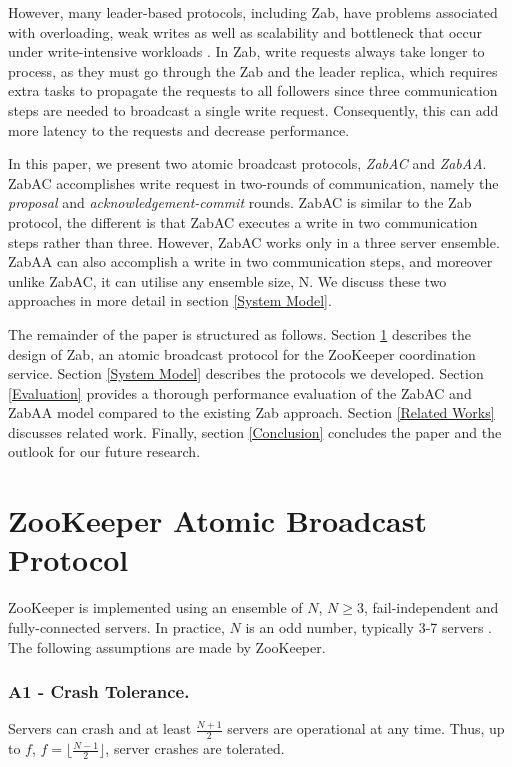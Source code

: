 \documentclass[a4paper,UKenglish]{oasics-v2016}
\begin{document}
However, many leader-based protocols, including Zab, have problems
associated with overloading, weak writes as well as scalability and bottleneck that occur under write-intensive workloads \cite{r5,r9,r39}.
In Zab, write requests always take longer to process, as they must
go through the Zab and the leader replica, which requires extra tasks
to propagate the requests to all followers since three communication
steps are needed to broadcast a single write request. Consequently, this can
add more latency to the requests and decrease performance.

In this paper, we present two atomic broadcast
protocols, \emph{ZabAC} and  \emph{ZabAA}. ZabAC accomplishes write request
in two-rounds of communication, namely the \emph{proposal} and \emph{acknowledgement-commit} rounds. ZabAC is similar to the Zab protocol, the different is that ZabAC executes a write in two communication steps rather than three. However, ZabAC works only in a three server ensemble. ZabAA can also accomplish a write in two communication steps, and moreover unlike ZabAC, it can utilise any ensemble size, N. We discuss these two approaches in more detail in section \ref{System Model}.

The remainder of the paper is structured as follows. Section \ref{Zookeeper-broadcast-protocol}  describes the design of Zab, an atomic broadcast protocol for the ZooKeeper coordination service. Section \ref{System Model} describes the protocols we developed. Section \ref{Evaluation} provides a thorough performance evaluation of the ZabAC and ZabAA model compared to the existing Zab approach. Section \ref{Related Works} discusses related work. Finally, section \ref{Conclusion} concludes the paper and the outlook for our future research.



\section{ZooKeeper Atomic Broadcast Protocol} \label{Zookeeper-broadcast-protocol}

ZooKeeper is implemented using an ensemble of $N$, $N \geq 3 $, fail-independent and fully-connected servers.
In practice, $N$ is an odd number, typically 3-7 servers \cite{r6}. The following assumptions are made by ZooKeeper.

\subsubsection*{A1 - Crash Tolerance.}
Servers can crash and at least $\frac{N+1}{2}$ servers are operational at any time.
Thus, up to  $f$, $f = \lfloor\frac{N-1}{2}\rfloor$, server crashes are tolerated.
\end{document}
